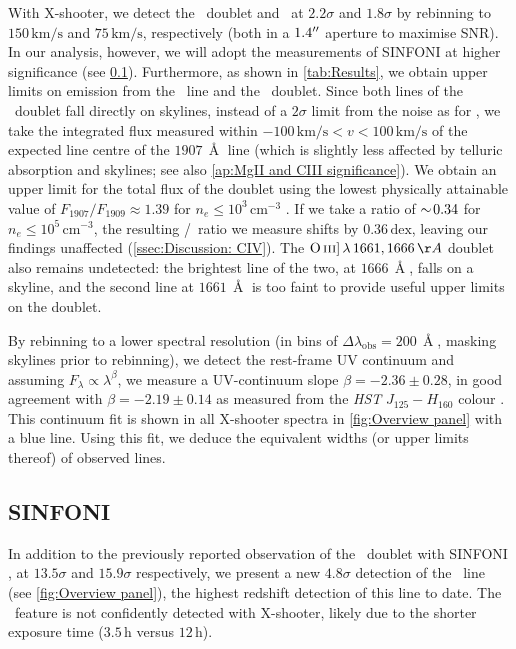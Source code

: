 With X-shooter, we detect the \OII\ doublet and \NeIII\ at $2.2 \sigma$ and $1.8 \sigma$ by rebinning to $150 \, \mathrm{km/s}$ and $75 \, \mathrm{km/s}$, respectively (both in a $1.4 \hbox{$^{\prime\prime}$}$ aperture to maximise SNR). In our analysis, however, we will adopt the measurements of SINFONI at higher significance (see \cref{ssec:Results: SINFONI}). Furthermore, as shown in \cref{tab:Results}, we obtain upper limits on emission from the \HeII\ line and the \CIII\ doublet. Since both lines of the \CIII\ doublet fall directly on skylines, instead of a $2\sigma$ limit from the noise as for \HeII, we take the integrated flux measured within $-100 \, \mathrm{km/s} < v < 100 \, \mathrm{km/s}$ of the expected line centre of the $1907 \, \Angstrom$ line (which is slightly less affected by telluric absorption and skylines; see also \cref{ap:MgII and CIII significance}). We obtain an upper limit for the total flux of the doublet using the lowest physically attainable value of $F_{1907}/F_{1909} \approx 1.39$ for $n_e \leq 10^3 \, \mathrm{cm^{-3}}$ \citep{2019ApJ...880...16K}. If we take a ratio of $\sim \! 0.34$ for $n_e \leq 10^5 \, \mathrm{cm^{-3}}$, the resulting \CIV/\CIII\ ratio we measure shifts by $0.36 \, \mathrm{dex}$, leaving our findings unaffected (\cref{ssec:Discussion: CIV}). The $\OIIIs \, \lambda \, 1661, 1666 \, \Angstrom$ doublet also remains undetected: the brightest line of the two, at $1666 \, \Angstrom$, falls on a skyline, and the second line at $1661 \, \Angstrom$ is too faint to provide useful upper limits on the doublet.

By rebinning to a lower spectral resolution (in bins of $\Delta \lambda_\text{obs} = 200 \, \Angstrom$, masking skylines prior to rebinning), we detect the rest-frame UV continuum and assuming $F_\lambda \propto \lambda^\beta$, we measure a UV-continuum slope $\beta = -2.36 \pm 0.28$, in good agreement with $\beta = -2.19 \pm 0.14$ as measured from the \textit{HST} $J_{125} - H_{160}$ colour \citep{2017MNRAS.467.3306S}. This continuum fit is shown in all X-shooter spectra in \cref{fig:Overview panel} with a blue line. Using this fit, we deduce the equivalent widths (or upper limits thereof) of observed lines.

\subsection{SINFONI}
\label{ssec:Results: SINFONI}

In addition to the previously reported observation of the \OII\ doublet with SINFONI \citep[\OII;][]{2007MNRAS.376..479S}, at $13.5 \sigma$ and $15.9 \sigma$ respectively, we present a new $4.8 \sigma$ detection of the \NeIII\ line (see \cref{fig:Overview panel}), the highest redshift detection of this line to date. The \NeIII\ feature is not confidently detected with X-shooter, likely due to the shorter exposure time ($3.5 \, \mathrm{h}$ versus $12 \, \mathrm{h}$).

